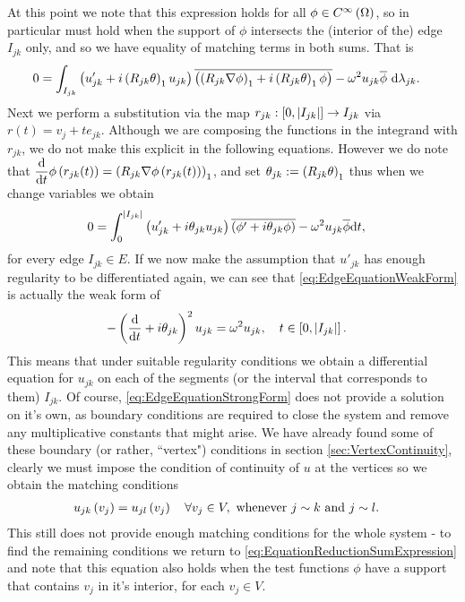 At this point we note that this expression holds for all $\phi\in C^{\infty}\left( \Omega \right)$, so in particular must hold when the support of $\phi$ intersects the (interior of the) edge $I_{jk}$ only, and so we have equality of matching terms in both sums.
That is
\begin{align*}
	0 &= \int_{I_{jk}}\left( u_{jk}' + i\left( R_{jk}\theta \right)_1 u_{jk} \right)\overline{\left( \left( R_{jk}\nabla\phi \right)_1 + i\left( R_{jk}\theta \right)_1 \phi \right)} - \omega^2 u_{jk}\overline{\phi} \ \mathrm{d}\lambda_{jk}.
\end{align*}
Next we perform a substitution via the map $r_{jk}:\left[ 0,\left\lvert I_{jk} \right\rvert \right]\rightarrow I_{jk}$ via $r(t) = v_{j}+t e_{jk}$.
Although we are composing the functions in the integrand with $r_{jk}$, we do not make this explicit in the following equations.
However we do note that $\dfrac{\mathrm{d}}{\mathrm{d}t}\phi\left( r_{jk}(t) \right) = \left( R_{jk}\nabla\phi\left( r_{jk}(t) \right) \right)_1$, and set $\theta_{jk} := \left( R_{jk}\theta \right)_1$ thus when we change variables we obtain
\begin{align} \label{eq:EdgeEquationWeakForm}
	0 &= \int_0^{\left\lvert I_{jk} \right\rvert} \left(  u'_{jk} + i\theta_{jk}u_{jk}  \right) \overline{\left(  \phi' + i\theta_{jk}\phi  \right)} - \omega^2 u_{jk}\overline{\phi} \mathrm{d} t,
\end{align}
for every edge $I_{jk}\in E$. 
If we now make the assumption that $u'_{jk}$ has enough regularity to be differentiated again, we can see that \eqref{eq:EdgeEquationWeakForm} is actually the weak form of
\begin{align} \label{eq:EdgeEquationStrongForm}
	-\left( \dfrac{\mathrm{d}}{\mathrm{d}t} + i\theta_{jk} \right)^2 u_{jk} &= \omega^2 u_{jk}, \quad t\in\left[ 0,\left\lvert I_{jk} \right\rvert \right].
\end{align}
This means that under suitable regularity conditions we obtain a differential equation for $u_{jk}$ on each of the segments (or the interval that corresponds to them) $I_{jk}$.
Of course, \eqref{eq:EdgeEquationStrongForm} does not provide a solution on it's own, as boundary conditions are required to close the system and remove any multiplicative constants that might arise.
We have already found some of these boundary (or rather, ``vertex") conditions in section \ref{sec:VertexContinuity}, clearly we must impose the condition of continuity of $u$ at the vertices so we obtain the matching conditions
\begin{align} \label{eq:EdgeEquationsMatchingConditons}
	u_{jk}\left( v_j \right) &= u_{jl}\left( v_j \right) \quad \forall v_j\in V, \text{ whenever } j\sim k \text{ and } j\sim l.
\end{align}
This still does not provide enough matching conditions for the whole system - to find the remaining conditions we return to \eqref{eq:EquationReductionSumExpression} and note that this equation also holds when the test functions $\phi$ have a support that contains $v_j$ in it's interior, for each $v_j\in V$.
